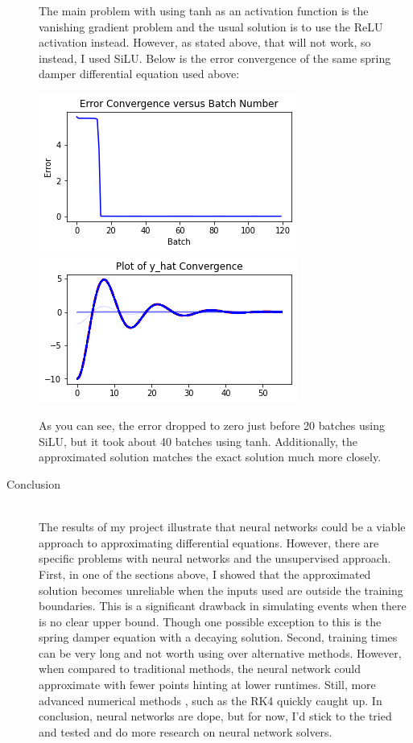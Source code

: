 \documentclass[12pt]{article}
\begin{document}
\begin{description}
\begin{minipage}{\linewidth}
    \end{minipage}
    The main problem with using tanh as an activation function is the vanishing
    gradient problem and the usual solution is to use the ReLU activation
    instead. However, as stated above, that will not work, so instead, I used
    SiLU. Below is the error convergence of the same spring damper differential
    equation used above: \\
    \begin{minipage}{\linewidth}
        \centering
        \includegraphics[scale=.5]{images/2ndsiluconv.png}
        \includegraphics[scale=.5]{images/2ndsilufn.png}
    \end{minipage}
    As you can see, the error dropped to zero just before 20 batches using
    SiLU, but it took about 40 batches using tanh. Additionally, the
    approximated solution matches the exact solution much more closely.

    \item[Conclusion] \hfill \\ 
    The results of my project illustrate that neural networks could be a viable
    approach to approximating differential equations. However, there are
    specific problems with neural networks and the unsupervised approach.
    First, in one of the sections above, I showed that the approximated
    solution becomes unreliable when the inputs used are outside the training
    boundaries. This is a significant drawback in simulating events when there
    is no clear upper bound. Though one possible exception to this is the
    spring damper equation with a decaying solution. Second, training times can
    be very long and not worth using over alternative methods. However, when
    compared to traditional methods, the neural network could approximate with
    fewer points hinting at lower runtimes. Still, more advanced numerical
    methods , such as the RK4 quickly caught up. In conclusion, neural networks
    are dope, but for now, I'd stick to the tried and tested and do more
    research on neural network solvers. 


\end{description}
\end{document}
